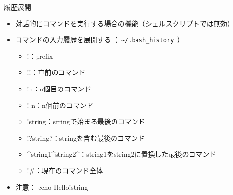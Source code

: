 \documentclass[12pt,aspectratio=169]{beamer}
\begin{document}
\begin{frame}{履歴展開}

  \begin{itemize}
    \item 対話的にコマンドを実行する場合の機能（シェルスクリプトでは無効）
    \item コマンドの入力履歴を展開する（\texttt { \textasciitilde/.bash\_history }）
      \begin{itemize}
        \item !：prefix
        \item !!：直前のコマンド
        \item !n：n個目のコマンド
        \item !-n：n個前のコマンド
        \item !string：stringで始まる最後のコマンド
        \item !?string?：stringを含む最後のコマンド
        \item \textasciicircum string1\textasciicircum string2\textasciicircum：string1をstring2に置換した最後のコマンド
        \item !\#：現在のコマンド全体
      \end{itemize}
    \item 注意： echo Hello!string
  \end{itemize}

\end{frame}
\end{document}
